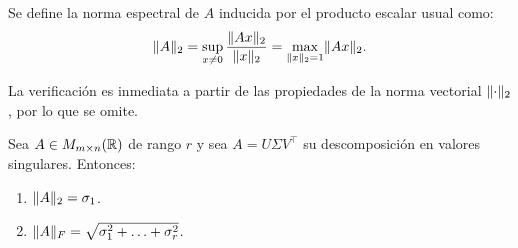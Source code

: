 \begin{definition}
	Se define la norma espectral de $A$ inducida por el producto escalar usual como:
	\[ \lVert A\rVert_2 = \sup_{x \neq 0} \frac{\lVert Ax\rVert_2}{\lVert x\rVert_2} = \max_{\lVert x\rVert_2 = 1} \lVert Ax\rVert_2. \]
\end{definition}

La verificación es inmediata a partir de las propiedades de la norma vectorial $\lVert\cdot\rVert_2$, por lo que se omite.

\begin{lemma}\label{lem:normas-svd}
	Sea $A \in M_{m \times n}(\mathbb{R})$ de rango $r$ y sea $A = U \Sigma V^{\top}$ su descomposición en valores singulares. Entonces:
	\begin{enumerate}
		\item $\lVert A\rVert_2 = \sigma_1$.
		\item $\lVert A\rVert_F = \sqrt{\sigma_1^2 + \ldots + \sigma_r^2}$.
	\end{enumerate}
\end{lemma}

